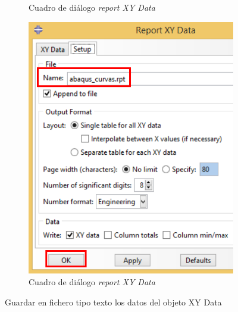 \begin{itemize}
\begin{figure}[!h]
\begin{subfigure}[!h]{0.37\textwidth}
      \caption{Cuadro de diálogo \textit{report XY Data}}
      \label{post20}
    \end{subfigure}%
    \begin{subfigure}[!h]{0.37\textwidth}
      \includegraphics[width=\textwidth]{./body/images/post21.pdf}
      \caption{Cuadro de diálogo \textit{report XY Data}}
      \label{post21}
    \end{subfigure}%
    \caption{Guardar en fichero tipo texto los datos del objeto XY
      Data}
  \end{figure}


\end{itemize}
